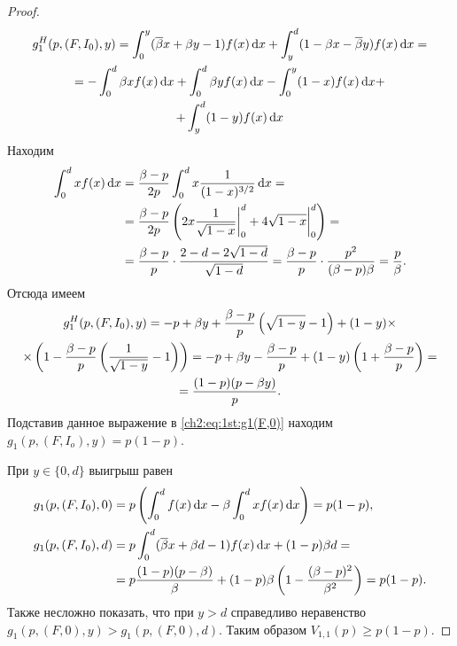 {\begin{proof}
  \begin{equation*}
    \begin{gathered}
    g^H_1(p, (F, I_0), y) 
    =
    \int_0^y ({\overline{\beta}} x + \beta y - 1) f(x) \mathop{}\!\mathrm{d} x +
    \int_y^d (1 - \beta x - {\overline{\beta}} y) f(x) \mathop{}\!\mathrm{d} x = \\
    =
    - \int_0^d \beta x f(x) \mathop{}\!\mathrm{d} x +
    \int_0^d \beta y f(x) \mathop{}\!\mathrm{d} x -
    \int_0^y (1-x) f(x) \mathop{}\!\mathrm{d} x + \\
    + \int_y^d (1-y) f(x) \mathop{}\!\mathrm{d} x
    \end{gathered}
  \end{equation*}
  Находим
  \begin{equation}
    \label{ch2:eq:1st:f-exp}
    \begin{aligned}
      \int_0^d x f(x) \mathop{}\!\mathrm{d} x 
      &= \frac{\beta - p}{2 p} \int_0^d x \frac{1}{(1-x)^{3/2}} \mathop{}\!\mathrm{d} x = \\
      &= \frac{\beta - p}{2 p} \left( 
        2x \frac{1}{\sqrt{1-x}} \bigg|_0^d +
        4 \sqrt{1-x} \bigg|_0^d
      \right) = \\
      &= \frac{\beta - p}{p} \cdot \frac{2 - d - 2\sqrt{1-d}}{\sqrt{1-d}} =
      \frac{\beta - p}{p} \cdot \frac{p^2}{(\beta - p) \beta} = \frac{p}{\beta}.
    \end{aligned}
  \end{equation}
  Отсюда имеем
  \begin{gather*}
    g^H_1(p, (F, I_0), y) 
    = -p + \beta y +
    \frac{\beta - p}{p} \left( \sqrt{1-y} - 1 \right) +
    (1-y) \times \\
    \times \left( 1 - \frac{\beta - p}{p} \left( \frac{1}{\sqrt{1-y}} - 1 \right) \right) =
    -p + \beta y - \frac{\beta - p}{p} + (1-y) \left( 1 + \frac{\beta - p}{p} \right) = \\
    = \frac{(1-p)(p - \beta y)}{p}.
  \end{gather*}
  Подставив данное выражение в \eqref{ch2:eq:1st:g1(F,0)} находим $g_1(p, (F, I_o), y) = p (1-p)$.

  При $y \in \{0, d\}$ выигрыш равен
  \begin{align*}
    g_1(p, (F, I_0), 0) 
    &= p \left(\int_0^d f(x) \mathop{}\!\mathrm{d} x - \beta \int_0^d x f(x) \mathop{}\!\mathrm{d} x \right) =
      p(1-p),\\
    g_1(p, (F, I_0), d) 
    &=
      p \int_0^d ({\overline{\beta}} x + \beta d - 1) f(x) \mathop{}\!\mathrm{d} x + (1-p) \beta d = \\
    &= p \frac{(1-p)(p-\beta)}{\beta} +
      (1-p) \beta \left( 1 - \frac{(\beta - p)^2}{\beta^2} \right) = p(1-p).
  \end{align*}
  Также несложно показать, что при $y > d$ справедливо неравенство $g_1(p, (F, 0), y) > g_1(p, (F, 0), d)$.
  Таким образом $V_{1,1}(p) \geq p(1-p)$.
\end{proof}


}
